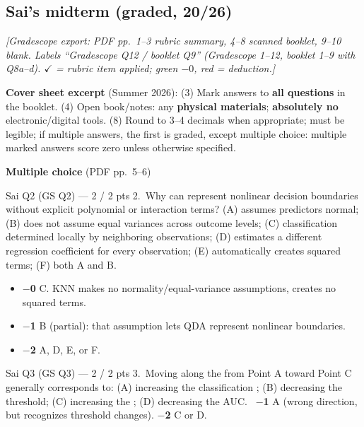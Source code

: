 \subsection{Sai's midterm (graded, 20/26)}
{\color{figgray}\itshape [Gradescope export: PDF pp.~1--3 rubric summary, 4--8 scanned booklet, 9--10 blank. Labels ``Gradescope Q12 / booklet Q9'' (Gradescope 1--12, booklet 1--9 with Q8a--d). $\checkmark$ = rubric item applied; {\color{keyc}green} $-0$, {\color{warnc}red} = deduction.]}

\textbf{Cover sheet excerpt} (Summer 2026): (3) Mark answers to \textbf{all questions} in the booklet. (4) Open book/notes: any \textbf{physical materials}; \textbf{absolutely no} electronic/digital tools. (8) Round to 3--4 decimals when appropriate; must be legible; if multiple answers, the first is graded, except multiple choice: multiple marked answers score zero unless otherwise specified.

\textbf{Multiple choice} (PDF pp.~5--6)

\begin{qbox}{Sai Q2 (GS Q2) --- 2 / 2 pts}
2.~Why can  represent nonlinear decision boundaries without explicit polynomial or interaction terms?
(A) assumes predictors normal; (B) does not assume equal variances across outcome levels; (C) classification determined locally by neighboring observations; (D) estimates a different regression coefficient for every observation; (E) automatically creates squared terms; (F) both A and B.
\grader
\begin{itemize}[leftmargin=1.2em]
\item[$\checkmark$] {\color{keyc}\bfseries $-$0} C. KNN makes no normality/equal-variance assumptions, creates no squared terms.
\item[] {\color{warnc}\bfseries $-$1} B (partial): that assumption lets QDA represent nonlinear boundaries.
\item[] {\color{warnc}\bfseries $-$2} A, D, E, or F.
\end{itemize}
\end{qbox}

\begin{qbox}{Sai Q3 (GS Q3) --- 2 / 2 pts}
3.~Moving along the  from Point A toward Point C generally corresponds to: (A) increasing the classification ; (B) decreasing the threshold; (C) increasing the ; (D) decreasing the AUC.
\grader\ {\color{warnc}\bfseries $-$1} A (wrong direction, but recognizes threshold changes). {\color{warnc}\bfseries $-$2} C or D.
\end{qbox}

